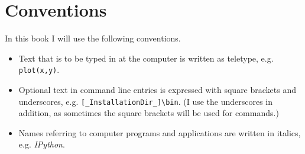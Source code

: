 \section{Conventions}

In this book I will use the following conventions.
\begin{itemize}
  \item Text that is to be typed in at the computer is written as teletype, e.g. \lstinline{plot(x,y)}.
  \item Optional text in command line entries is expressed with square brackets and underscores, e.g. \lstinline{[_InstallationDir_]\bin}. (I use the underscores in addition, as sometimes the square brackets will be used for commands.)
  \item Names referring to computer programs and applications are written in italics, e.g. \emph{IPython}.

\end{itemize}
